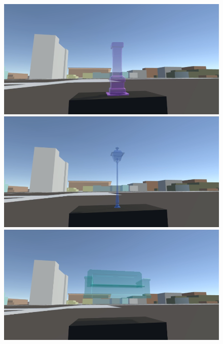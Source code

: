 \begin{appendices}
\begin{figure}
	\includegraphics[width=0.7\linewidth]{figures/tracing_shapes/finalstudy_shapes1}
	\par
	\includegraphics[width=0.7\linewidth]{figures/tracing_shapes/finalstudy_shapes2}
	\par
	\includegraphics[width=0.7\linewidth]{figures/tracing_shapes/finalstudy_shapes3}
	\par
\end{figure}
\begin{figure}
	\centering
	

\end{figure}
\end{appendices}
